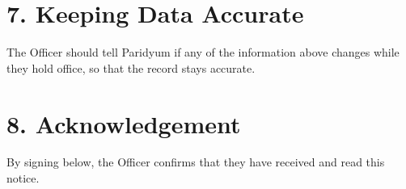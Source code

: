 \documentclass{paridyum}
\begin{document}
\section*{7. Keeping Data Accurate}
The Officer should tell Paridyum if any of the information above changes while they hold
office, so that the record stays accurate.

\section*{8. Acknowledgement}
By signing below, the Officer confirms that they have received and read this notice.

\vspace{1.5em}
\paridyumsignblock

\vspace{1.5em}
\end{document}
